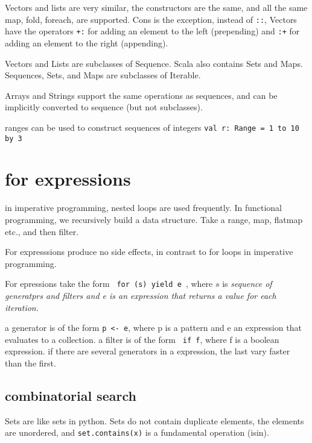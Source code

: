 Vectors and lists are very similar, the constructors are the same, and all the same map, fold, foreach, are supported. Cons is the exception, instead of \lstinline|::|, Vectors have the operators \lstinline|+:| for adding an element to the left (prepending) and \lstinline|:+| for adding an element to the right (appending).

Vectors and Lists are subclasses of Sequence. Scala also contains Sets and Maps. Sequences, Sets, and Maps are subclasses of Iterable.

Arrays and Strings support the same operations as sequences, and can be implicitly converted to sequence (but not subclasses).

ranges can be used to construct sequences of integers
\lstinline|val r: Range = 1 to 10 by 3|

\section{for expressions}

in imperative programming, nested loops are used frequently. In functional programming, we recursively build a data structure. Take a range, map, flatmap etc., and then filter.

For expresssions produce no side effects, in contrast to for loops in imperative programming.

For epressions take the form \lstinline| for (s) yield e |, where $s$ is \em{sequence of generatprs and filters} and e is an expression that returns a value for each iteration.

a generator is of the form \lstinline|p <- e|, where p is a pattern and e an expression that evaluates to a collection. a filter is of the form \lstinline| if f|, where f is a boolean expression. if there are several generators in a expression, the last vary faster than the first.

\subsection{combinatorial search}

Sets are like sets in python. Sets do not contain duplicate elements, the elements are unordered, and \lstinline|set.contains(x)| is a fundamental operation (isin).










